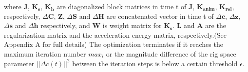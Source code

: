 where $\boldsymbol{J}$, $\boldsymbol{K_s}$, $\boldsymbol{K_h}$ are diagonalized block matrices in time t of $\mathbf{J}$, $\mathbf{K_{anim}}$, $\mathbf{K_{rel}}$, respectively, $\Delta\boldsymbol{C}$, $\boldsymbol{Z}$, $\Delta\boldsymbol{S}$ and $\Delta\boldsymbol{H}$ are concatenated vector in time t of $\Delta\mathbf{c}$, $\Delta\mathbf{z}$, $\Delta\mathbf{s}$ and $\Delta\mathbf{h}$ respectively, and $\boldsymbol{W}$ is weight matrix for $\boldsymbol{K_s}$. $\boldsymbol{L}$ and $\boldsymbol{A}$ are the regularization matrix and the acceleration energy matrix, respectively\cite{ho2010spatial}.(See Appendix A for full details)
The optimization terminates if it reaches the maximum iteration number $max_i$ or the magnitude difference of the rig space parameter $||\Delta c(t)||^2$ between the iteration steps is below a certain threshold $\epsilon$. 



